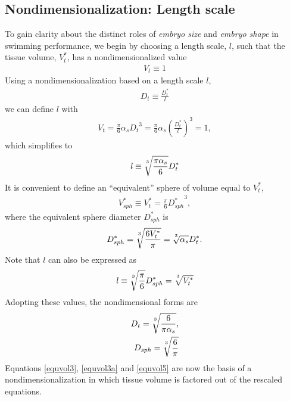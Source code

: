 \documentclass[10pt,a4paper]{article}
\def\non{\nonumber}
\def\l{\mathit{l}}
\def\Dts{D_t^*}
\def\Dt{D_t}
\def\Dss{D_{sph}^*}
\def\Ds{D_{sph}}
\def\Vts{V_t^*}
\def\Vt{V_t}
\def\Vss{V_{sph}^*}
\begin{document}

\subsection{Nondimensionalization: Length scale}
To gain clarity about the distinct roles of \textit{embryo size} and \textit{embryo shape} in swimming performance, we begin by choosing a length scale, $\l$, such that the tissue volume, $\Vts$, has a nondimensionalized value 
\begin{eqnarray}\label{equvol0}
	\Vt \equiv 1
\end{eqnarray} 
Using a nondimensionalization based on a length scale $\l$,
\begin{eqnarray}\label{equvol1}
	\Dt \equiv \frac{\Dts}{\l}
\end{eqnarray} 
we can define $\l$ with 
\begin{eqnarray}\label{equvol2}
	\Vt = \frac{\pi}{6} \alpha_s {\Dt}^3 = \frac{\pi}{6} \alpha_s \left(\frac{\Dts}{\l}\right)^3 = 1,
\end{eqnarray} 
which simplifies to
\begin{eqnarray}\label{equvol3}
	\l \equiv \sqrt[\uproot{5}3]{\frac{\pi \alpha_s}{6}} \Dts
\end{eqnarray} 
It is convenient to define an ``equivalent'' sphere of volume equal to $V_t^*$,
\begin{eqnarray}\label{equivsphere}
	\Vss \equiv \Vts = \frac{\pi}{6} {\Dss}^3,
\end{eqnarray} 
where the equivalent sphere diameter $\Dss$ is
\begin{eqnarray}\label{equvol4}
	\Dss = \sqrt[\uproot{5}3]{\frac{6 \Vts}{\pi}} = \sqrt[\uproot{5}3]{\alpha_s} \Dts .
\end{eqnarray} 
Note that $\l$ can also be expressed as
\begin{eqnarray}\label{equvol3a}
	\l \equiv \sqrt[\uproot{5}3]{\frac{\pi}{6}} \Dss = \sqrt[\uproot{5}3]{\Vts}
\end{eqnarray} 
Adopting these values, the nondimensional forms are
\begin{eqnarray}\label{equvol5}
	\Dt = \sqrt[\uproot{5}3]{\frac{6}{\pi \alpha_s}} \non, \\
	\Ds = \sqrt[\uproot{5}3]{\frac{6}{\pi}}
\end{eqnarray}
Equations \ref{equvol3}, \ref{equvol3a} and \ref{equvol5} are now the basis of a nondimensionalization in which tissue volume is factored out of the rescaled equations.
\end{document}
